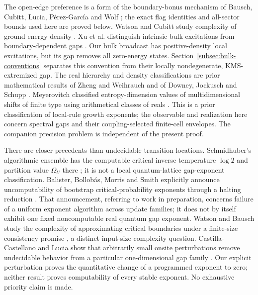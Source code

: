 The open-edge preference is a form of the boundary-bonus mechanism of
Bausch, Cubitt, Lucia, P\'erez-Garc\'ia and Wolf \cite{sizeDriven}; the
exact flag identities and all-sector bounds used here are proved below.
Watson and Cubitt study complexity of ground energy density
\cite{energyDensity}. Xu et al. distinguish intrinsic bulk excitations
from boundary-dependent gaps \cite{bulkGap}. Our bulk broadcast
has positive-density local excitations, but its gap removes all
zero-energy states. Section~\ref{subsec:bulk-conventions} separates
this convention from their locally nondegenerate, KMS-extremized gap. The real hierarchy and density
classifications are prior mathematical results of Zheng and Weihrauch
and of Downey, Jockusch and Schupp \cite{zhengWeihrauch,density}.
Meyerovitch classified entropy-dimension values of multidimensional
shifts of finite type using arithmetical classes of reals
\cite{meyerovitchGrowth}. This is a prior classification of local-rule
growth exponents; the observable and realization here concern spectral
gaps and their coupling-selected finite-cell envelopes.
The companion precision problem \cite{pricePrecision} is independent
of the present proof.

There are closer precedents than undecidable transition locations.
Schmidhuber's algorithmic ensemble has the computable critical
inverse temperature $\log2$ and partition value $\Omega_U$ there
\cite{algorithmicTransition}; it is not a local quantum-lattice
gap-exponent classification. Balister, Bollob\'as, Morris and Smith
explicitly announce uncomputability of bootstrap critical-probability
exponents through a halting reduction \cite{bootstrapUniversality}.
That announcement, referring to work in preparation, concerns failure
of a uniform exponent algorithm across update families; it does not
by itself exhibit one fixed noncomputable real quantum gap exponent.
Watson and Bausch study the complexity of approximating critical
boundaries under a finite-size consistency promise
\cite{criticalBoundary}, a distinct input-size complexity question.
Castilla-Castellano and Lucia show that arbitrarily small onsite
perturbations remove undecidable behavior from a particular
one-dimensional gap family \cite{gapInstability}. Our explicit
perturbation proves the quantitative change of a programmed exponent
to zero; neither result proves computability of every stable exponent.
No exhaustive priority claim is made.
